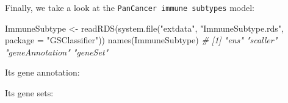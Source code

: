 \documentclass[
  12pt,
]{book}
\newenvironment{Shaded}{\begin{snugshade}}{\end{snugshade}}
\newcommand{\AttributeTok}[1]{\textcolor[rgb]{0.77,0.63,0.00}{#1}}
\newcommand{\CommentTok}[1]{\textcolor[rgb]{0.56,0.35,0.01}{\textit{#1}}}
\newcommand{\FunctionTok}[1]{\textcolor[rgb]{0.00,0.00,0.00}{#1}}
\newcommand{\NormalTok}[1]{#1}
\newcommand{\OtherTok}[1]{\textcolor[rgb]{0.56,0.35,0.01}{#1}}
\newcommand{\SpecialCharTok}[1]{\textcolor[rgb]{0.00,0.00,0.00}{#1}}
\newcommand{\StringTok}[1]{\textcolor[rgb]{0.31,0.60,0.02}{#1}}
\begin{document}
Finally, we take a look at the \texttt{PanCancer\ immune\ subtypes} model:

\begin{Shaded}
\begin{Highlighting}[]
\NormalTok{ImmuneSubtype }\OtherTok{\textless{}{-}} \FunctionTok{readRDS}\NormalTok{(}\FunctionTok{system.file}\NormalTok{(}\StringTok{"extdata"}\NormalTok{, }\StringTok{"ImmuneSubtype.rds"}\NormalTok{, }\AttributeTok{package =} \StringTok{"GSClassifier"}\NormalTok{))}
\FunctionTok{names}\NormalTok{(ImmuneSubtype)}
\CommentTok{\# [1] "ens"            "scaller"        "geneAnnotation" "geneSet"}
\end{Highlighting}
\end{Shaded}

Its gene annotation:

\begin{Shaded}
\end{Shaded}

Its gene sets:
\end{document}
